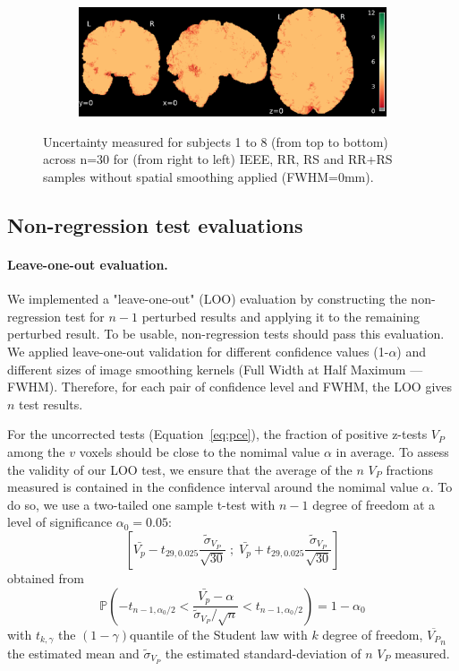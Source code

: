 \documentclass{article}
\begin{document}
\begin{landscape}
\begin{figure}
\begin{subfigure}[t]{0.2\paperheight}
        \end{subfigure}
        \begin{subfigure}[t]{0.2\paperheight}
            \centering
            \includegraphics[width=\textwidth]{figures/sig/ds002338_sub-xp207_rr.rs_sig.pdf}
        \end{subfigure}
        \caption{Uncertainty measured for subjects 1 to 8 (from top to bottom) across n=30 for
            (from right to left) IEEE, RR, RS and RR+RS samples without spatial smoothing applied (FWHM=0mm). }
        \label{fig:uncertainty_sub_1}

    \end{figure}
\end{landscape}

\subsection{Non-regression test evaluations}

\paragraph{Leave-one-out evaluation.} We implemented a "leave-one-out" (LOO)
evaluation by constructing the non-regression test for $n-1$ perturbed results
and applying it to the remaining perturbed result. To be usable, non-regression
tests should pass this evaluation. We applied leave-one-out validation for
different  confidence values (1-$\alpha$) and different sizes of image smoothing
kernels (Full Width at Half Maximum --- FWHM). Therefore, for each pair of
confidence level and FWHM, the LOO gives $n$ test results.

For the uncorrected tests (Equation~\ref{eq:pce}), the fraction of positive
z-tests $V_P$ among the $v$ voxels should be close to the nomimal value $\alpha$
in average. To assess the validity of our LOO test, we ensure that the average
of the $n$ $V_P$ fractions measured is contained in the confidence interval
around the nomimal value $\alpha$. To do so, we use a two-tailed one sample
t-test with $n-1$ degree of freedom at a level of significance $\alpha_0=0.05$:
\[
    \left[
    \bar{V_p} -t_{29,0.025} \frac{\tilde{\sigma}_{V_P}}{\sqrt{30}}
    \; ; \;
    \bar{V_p}  + t_{29,0.025} \frac{\tilde{\sigma}_{V_P}}{\sqrt{30}}
    \right]
\]
obtained from
\[
    \mathbb{P}
    \left(
    -t_{n-1,\alpha_0/2}
    <
    \dfrac{\bar{V_p} - \alpha}{\tilde{\sigma}_{V_P} / \sqrt{n}}
    <
    t_{n-1,\alpha_0/2}
    \right)
    = 1 - \alpha_0
\]
with
$t_{k,\gamma}$ the $(1-\gamma)$quantile of the Student law with $k$ degree of freedom,
$\overline{V_P}_n$ the estimated mean and $\tilde{\sigma}_{V_P}$ the estimated standard-deviation
of $n$ $V_P$ measured.
\end{document}
